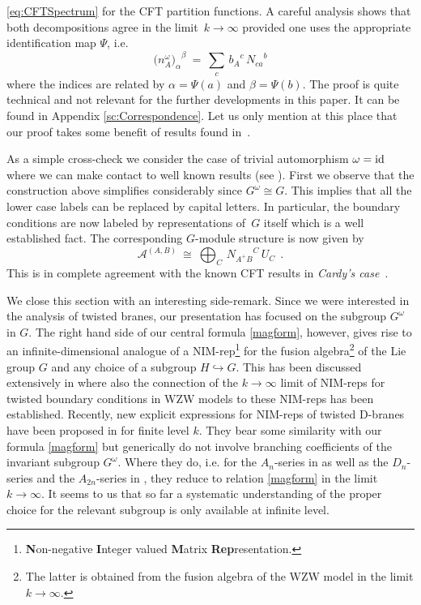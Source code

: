 \documentclass[12pt,a4paper]{article}
\newcommand{\embin}{{\hookrightarrow}}
\newcommand{\mc}{\mathcal} %
\def\Iso{\Psi}
\def\iG{G^\omega} %
\def\id{{\rm id}}
\begin{document}
\eqref{eq:CFTSpectrum} for the CFT partition functions.
A careful analysis shows that both decompositions agree 
in the limit~$k\to\infty$ provided one uses the appropriate 
identification map $\Iso$, i.e.\ 
\begin{equation} \label{magform} 
  {\bigl(n_A^\omega\bigr)_\alpha}^\beta
  \ = \ \sum_{c}\, {b_{A}}^c\, {N_{ca}}^b
\end{equation} 
where the indices are related by $\alpha=\Iso(a)$ and
$\beta=\Iso(b)$.
The proof is quite technical and not relevant for the further 
developments in this paper. It can be found in Appendix 
\ref{sc:Correspondence}. Let us only mention at this 
place that our proof takes some benefit of results found
in~\cite{Quella:2001wh,Quella:2002wi}.
\smallskip

As a simple cross-check we consider the case of trivial automorphism
$\omega=\id$ where we can make contact to well known results (see  
\cite{Alekseev:1999bs}). First we observe that the construction 
above simplifies considerably since $\iG \cong G$. This implies 
that all the lower case labels can be replaced by capital letters.
In particular, the boundary conditions are now labeled by 
representations of~$G$ itself which is a well established fact. 
The corresponding $G$-module structure is now given by
\begin{equation*}
  \mc{A}^{(A,B)}
  \ \cong \ \bigoplus_C \, {N_{A^+B}}^{C} \, U_{C}\ \ .
\end{equation*}
This is in complete agreement with the known CFT results in
{\em Cardy's case}~\cite{Cardy:1989ir}.%
\medskip%

We close this section with an interesting side-remark. Since we 
were interested in the analysis of twisted branes, our presentation 
has focused on the subgroup $\iG$ in $G$. The right hand side of 
our central formula \eqref{magform}, however, gives rise
to an infinite-dimensional analogue of a NIM-rep\footnote{{\bf N}on-negative
{\bf I}nteger valued {\bf M}atrix {\bf Rep}resentation.} for the fusion
algebra\footnote{The latter is obtained from the fusion algebra of the WZW
model in the limit $k\rightarrow \infty$.} of the Lie group $G$ and any choice
of a subgroup $H \embin G$.
This has been discussed extensively in \cite{Quella:2001wh} where also
the connection of the $k\to\infty$ limit of NIM-reps for twisted boundary
conditions in WZW models to these NIM-reps has been established.
Recently, new explicit expressions for NIM-reps of twisted D-branes have been
proposed in \cite{Petkova:2002yj,Gaberdiel:2002qa} for finite level $k$.
They bear some similarity with our formula \eqref{magform} but generically
do not involve branching coefficients of the invariant subgroup $\iG$.
Where they do, i.e. for the $A_n$-series in \cite{Petkova:2002yj} as well as
the $D_n$-series and the $A_{2n}$-series in \cite{Gaberdiel:2002qa},
they reduce to relation \eqref{magform} in the limit $k\to\infty$.
It seems to us that so far a systematic understanding of the proper
choice for the relevant subgroup is only available at infinite level.
\end{document}
